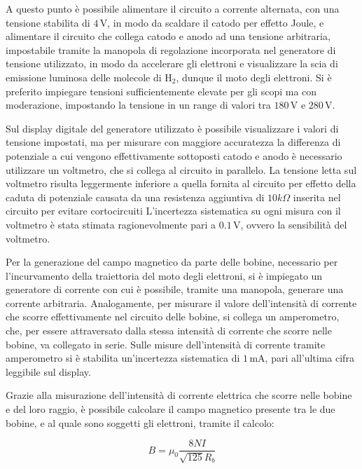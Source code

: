 \documentclass[a4paper,12pt]{article}
\begin{document}
A questo punto è possibile alimentare il circuito a corrente alternata, con una tensione stabilita di \( 4 \, \text{V} \), in modo da scaldare il catodo per effetto Joule, e alimentare il circuito che collega catodo e anodo ad una tensione arbitraria, impostabile tramite la manopola di regolazione incorporata nel generatore di tensione utilizzato, in modo da accelerare gli elettroni e visualizzare la scia di emissione luminosa delle molecole di \( \text{H}_2 \), dunque il moto degli elettroni. Si è preferito impiegare tensioni sufficientemente elevate per gli scopi ma con moderazione, impostando la tensione in un range di valori tra \( 180 \, \text{V} \) e \( 280 \, \text{V} \).

Sul display digitale del generatore utilizzato è possibile visualizzare i valori di tensione impostati, ma per misurare con maggiore accuratezza la differenza di potenziale a cui vengono effettivamente sottoposti catodo e anodo è necessario utilizzare un voltmetro, che si collega al circuito in parallelo. La tensione letta sul voltmetro risulta leggermente inferiore a quella fornita al circuito per effetto della caduta di potenziale causata da una resistenza aggiuntiva di \(10 k \Omega\) inserita nel circuito per evitare cortocircuiti L’incertezza sistematica su ogni misura con il voltmetro è stata stimata ragionevolmente pari a \( 0.1 \, \text{V} \), ovvero la sensibilità del voltmetro.

Per la generazione del campo magnetico da parte delle bobine, necessario per l’incurvamento della traiettoria del moto degli elettroni, si è impiegato un generatore di corrente con cui è possibile, tramite una manopola, generare una corrente arbitraria. Analogamente, per misurare il valore dell’intensità di corrente che scorre effettivamente nel circuito delle bobine, si collega un amperometro, che, per essere attraversato dalla stessa intensità di corrente che scorre nelle bobine, va collegato in serie. Sulle misure dell’intensità di corrente tramite amperometro si è stabilita un’incertezza sistematica di \( 1 \, \text{mA} \), pari all'ultima cifra leggibile sul display.

Grazie alla misurazione dell’intensità di corrente elettrica che scorre nelle bobine e del loro raggio, è possibile calcolare il campo magnetico presente tra le due bobine, e al quale sono soggetti gli elettroni, tramite il calcolo:

\begin{equation}
    B = \mu_0 \frac{8 N I}{\sqrt{125} R_b}
    \label{eq:campo_magnetico_bobine}
\end{equation}
\end{document}
